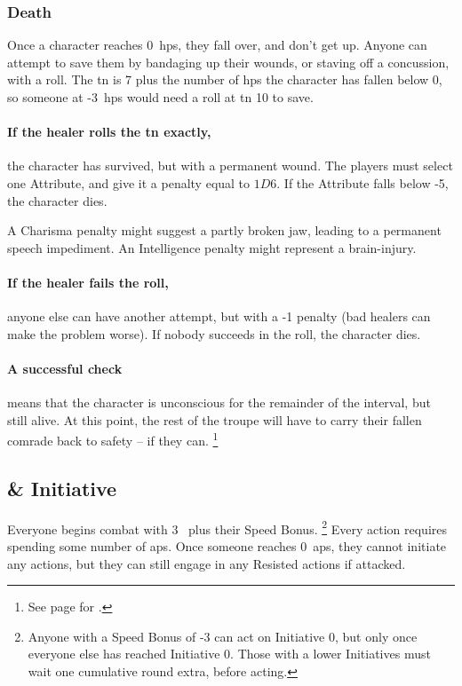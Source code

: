 \begin{multicols}{2}
\subsubsection{Death}
\label{death}
Once a character reaches 0~\glspl{hp}, they fall over, and don't get up.
Anyone can attempt to save them by bandaging up their wounds, or staving off a concussion, with a  roll.
The \gls{tn} is 7 plus the number of \glspl{hp} the character has fallen below 0, so someone at -3~\glspl{hp} would need a roll at \gls{tn} 10 to save.

\paragraph{If the healer rolls the \gls{tn} exactly,}
the character has survived, but with a permanent wound.
The players must select one Attribute, and give it a penalty equal to $1D6$.
If the Attribute falls below -5, the character dies.

A Charisma penalty might suggest a partly broken jaw, leading to a permanent speech impediment.
An Intelligence penalty might represent a brain-injury.

\paragraph{If the healer fails the roll,}
anyone else can have another attempt, but with a -1 penalty (bad healers can make the problem worse).
If nobody succeeds in the roll, the character dies.

\paragraph{A successful check}
means that the character is unconscious for the remainder of the \gls{interval}, but still alive.
At this point, the rest of the troupe will have to carry their fallen comrade back to safety -- if they can.%
\footnote{See page \pageref{weight} for .}

\subsection{ \& Initiative}
\label{actionPoints}

Everyone begins combat with 3~ plus their Speed Bonus.%
\footnote{Anyone with a Speed Bonus of -3 can act on Initiative 0, but only once everyone else has reached Initiative 0.
Those with a lower Initiatives must wait one cumulative round extra, before acting.}
Every action requires spending some number of \glspl{ap}.
Once someone reaches 0~\glspl{ap}, they cannot initiate any actions, but they can still engage in any Resisted actions if attacked.


\end{multicols}

